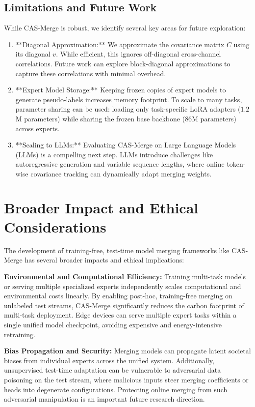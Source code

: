 \documentclass{article}
\begin{document}
\subsection{Limitations and Future Work}
While CAS-Merge is robust, we identify several key areas for future exploration:
\begin{enumerate}
    \item **Diagonal Approximation:** We approximate the covariance matrix $C$ using its diagonal $v$. While efficient, this ignores off-diagonal cross-channel correlations. Future work can explore block-diagonal approximations to capture these correlations with minimal overhead.
    \item **Expert Model Storage:** Keeping frozen copies of expert models to generate pseudo-labels increases memory footprint. To scale to many tasks, parameter sharing can be used: loading only task-specific LoRA adapters ($1.2$M parameters) while sharing the frozen base backbone ($86$M parameters) across experts.
    \item **Scaling to LLMs:** Evaluating CAS-Merge on Large Language Models (LLMs) is a compelling next step. LLMs introduce challenges like autoregressive generation and variable sequence lengths, where online token-wise covariance tracking can dynamically adapt merging weights.
\end{enumerate}

\section{Broader Impact and Ethical Considerations}
The development of training-free, test-time model merging frameworks like CAS-Merge has several broader impacts and ethical implications:

\textbf{Environmental and Computational Efficiency:} Training multi-task models or serving multiple specialized experts independently scales computational and environmental costs linearly. By enabling post-hoc, training-free merging on unlabeled test streams, CAS-Merge significantly reduces the carbon footprint of multi-task deployment. Edge devices can serve multiple expert tasks within a single unified model checkpoint, avoiding expensive and energy-intensive retraining.

\textbf{Bias Propagation and Security:} Merging models can propagate latent societal biases from individual experts across the unified system. Additionally, unsupervised test-time adaptation can be vulnerable to adversarial data poisoning on the test stream, where malicious inputs steer merging coefficients or heads into degenerate configurations. Protecting online merging from such adversarial manipulation is an important future research direction.
\end{document}
